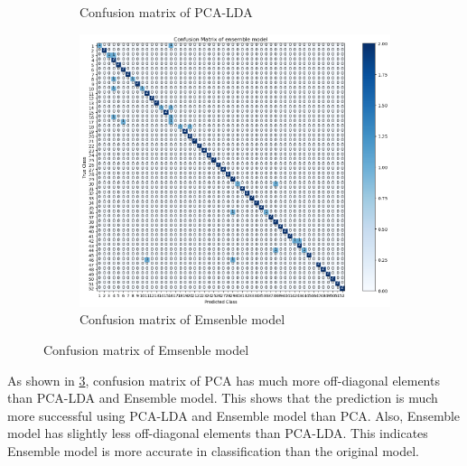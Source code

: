 \begin{figure}[htbp]
\begin{subfigure}[t]{0.3\linewidth}
	\caption{Confusion matrix of PCA-LDA}
	\label{fig:q3_1_cm}
        \end{subfigure}
    \quad
        \begin{subfigure}[t]{0.3\linewidth}
        \centering
        \includegraphics[width=\linewidth]{image/q3_2_cm.png} %
	\caption{Confusion matrix of Emsenble model}
	\label{fig:q3_1_cm}
        \end{subfigure}
    \label{fig:cm}
\end{figure}

As shown in \cref{fig:cm}, confusion matrix of PCA has much more off-diagonal elements than PCA-LDA and Ensemble model. This shows that the prediction is much more successful using PCA-LDA and Ensemble model than PCA. Also, Ensemble model has slightly less off-diagonal elements than PCA-LDA. This indicates Ensemble model is more accurate in classification than the original model. 

\newpage
